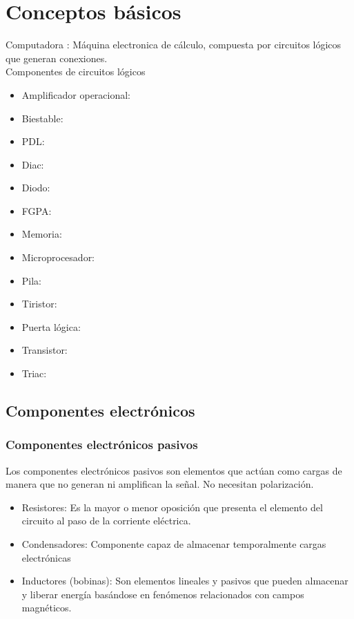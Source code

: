 \chapter{Conceptos b\'asicos}
Computadora : M\'aquina electronica de c\'alculo, compuesta por circuitos l\'ogicos que generan conexiones.\\

Componentes de circuitos lógicos 
\begin{itemize}
\item Amplificador operacional:
\item Biestable:
\item PDL:
\item Diac:
\item Diodo:
\item FGPA: 
\item Memoria:
\item Microprocesador:
\item Pila:
\item Tiristor:
\item Puerta l\'ogica:
\item Transistor:
\item Triac: 
\end{itemize}



\section{Componentes electr\'onicos}
\subsection{Componentes electr\'onicos pasivos}
Los componentes electr\'onicos pasivos son elementos que act\'uan como cargas de manera que no generan ni amplifican la se\~nal. No necesitan polarizaci\'on.
\begin{itemize}
\item Resistores: Es la mayor o menor oposici\'on que presenta el elemento del circuito al paso de la corriente el\'ectrica.
\item Condensadores: Componente capaz de almacenar temporalmente cargas electr\'onicas
\item Inductores (bobinas): Son elementos lineales y pasivos que pueden almacenar y liberar energ\'ia bas\'andose en fen\'omenos relacionados con campos magn\'eticos.
\end{itemize}


